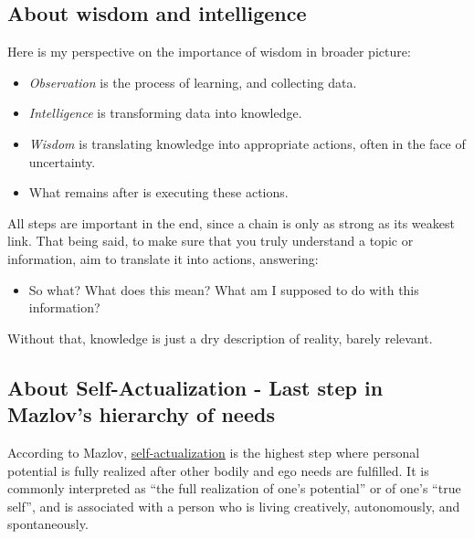 \documentclass[
]{book}
\providecommand{\tightlist}{%
  \setlength{\itemsep}{0pt}\setlength{\parskip}{0pt}}
\begin{document}
\hypertarget{about-wisdom-and-intelligence}{%
\subsection{About wisdom and intelligence}\label{about-wisdom-and-intelligence}}

Here is my perspective on the importance of wisdom in broader picture:

\begin{itemize}
\tightlist
\item
  \emph{Observation} is the process of learning, and collecting data.
\item
  \emph{Intelligence} is transforming data into knowledge.
\item
  \emph{Wisdom} is translating knowledge into appropriate actions, often in the face of uncertainty.
\item
  What remains after is executing these actions.
\end{itemize}

All steps are important in the end, since a chain is only as strong as its weakest link. That being said, to make sure that you truly understand a topic or information, aim to translate it into actions, answering:

\begin{itemize}
\tightlist
\item
  So what? What does this mean? What am I supposed to do with this information?
\end{itemize}

Without that, knowledge is just a dry description of reality, barely relevant.

\hypertarget{about-self-actualization---last-step-in-mazlovs-hierarchy-of-needs}{%
\subsection{About Self-Actualization - Last step in Mazlov's hierarchy of needs}\label{about-self-actualization---last-step-in-mazlovs-hierarchy-of-needs}}

According to Mazlov, \href{https://en.wikipedia.org/wiki/Self-actualization}{self-actualization} is the highest step where personal potential is fully realized after other bodily and ego needs are fulfilled. It is commonly interpreted as ``the full realization of one's potential'' or of one's ``true self'', and is associated with a person who is living creatively, autonomously, and spontaneously.
\end{document}
